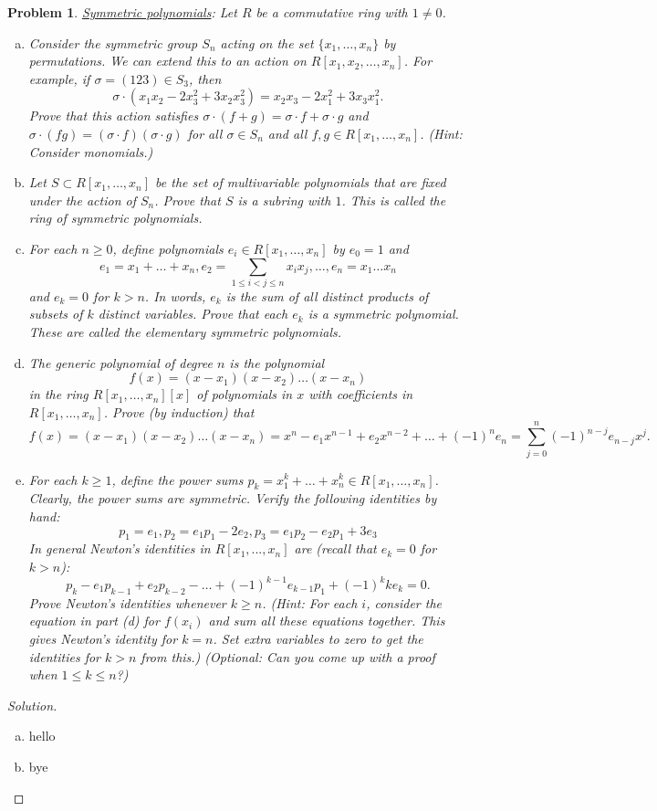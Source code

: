 \documentclass[10pt]{article}
\newtheorem{Prob}{Problem}
\theoremstyle{definition}
\theoremstyle{remark}
\newenvironment{solution}
  {\renewcommand\qedsymbol{$\blacksquare$}\begin{proof}[Solution]}
  {\end{proof}}
\begin{document}
\begin{Prob}
	\underline{Symmetric polynomials}: Let $R$ be a commutative ring with $1\neq 0$.
	\begin{enumerate}[a)]
		\item Consider the symmetric group $S_n$ acting on the set $\{x_1,\dots, x_n\}$ by permutations. We can extend this to an action on $R[x_1, x_2, \dots, x_n]$. For example, if $\sigma = (123) \in S_3$, then
		$$\sigma \cdot (x_1x_2 - 2x^2_3 + 3x_2x^2_3) = x_2x_3 - 2x^2_1 + 3x_3 x^2_1.$$
		Prove that this action satisfies $\sigma \cdot (f + g) = \sigma \cdot f + \sigma \cdot g$ and $\sigma \cdot (fg) = (\sigma \cdot f)(\sigma \cdot g)$ for all $\sigma \in S_n$ and all $f, g \in R[x_1, \dots , x_n]$. (Hint: Consider monomials.)
		\item Let $S \subset R[x_1, \dots , x_n]$ be the set of multivariable polynomials that are fixed under the action of $S_n$. Prove that $S$ is a subring with $1$. This is called the ring of symmetric polynomials.
		\item For each $n \geq 0$, define polynomials $e_i \in R[x_1, \dots , x_n]$ by $e_0 = 1$ and $$e_1 = x_1 + \dots + x_n, e_2 =\sum_{1\leq i<j\leq n} x_ix_j , \dots , e_n = x_1 \dots x_n$$
		and $e_k = 0$ for $k > n$. In words, $e_k$ is the sum of all distinct products of subsets of $k$ distinct variables. Prove that each $e_k$ is a symmetric polynomial. These are called the elementary symmetric polynomials.
		\item The generic polynomial of degree $n$ is the polynomial
		$$f(x) = (x - x_1)(x - x_2)\dots (x - x_n)$$
		in the ring $R[x_1, \dots , x_n][x]$ of polynomials in $x$ with coefficients in $R[x_1, \dots , x_n]$. Prove (by induction) that
		$$f(x) = (x-x_1)(x-x_2)\dots(x-x_n) = x^n -e_1x^{n-1}+e_2x^{n-2}+\dots+ (-1)^n e_n =\sum_{j=0}^{n}(-1)^{n-j}e_{n-j}x^j.$$
		\item For each $k \geq 1$, define the power sums $p_k = x^k_1+\dots+x^k_n\in R[x_1, \dots , x_n]$. Clearly, the
		power sums are symmetric. Verify the following identities by hand:
		$$p_1 = e_1, p_2 = e_1p_1 - 2e_2, p_3 = e_1p_2 - e_2p_1 + 3e_3$$
		In general Newton’s identities in $R[x_1, . . . , x_n]$ are (recall that $e_k = 0$ for $k > n$):
		$$p_k - e_1p_{k-1} + e_2p_{k-2} - \dots + (-1)^{k-1}e_{k-1}p_1 + (-1)^k ke_k = 0.$$
		Prove Newton’s identities whenever $k \geq n$.
		(Hint: For each $i$, consider the equation in part (d) for $f(x_i)$ and sum all these equations
		together. This gives Newton’s identity for $k = n$. Set extra variables to zero to get the
		identities for $k > n$ from this.) (Optional: Can you come up with a proof when $1 \leq k \leq n$?)

		
	\end{enumerate} 
\end{Prob}

\begin{solution}
    \begin{enumerate}[a)]
    \item hello
    \item bye
    
    \end{enumerate}
\end{solution}


\end{document}
